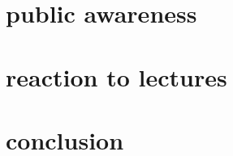 \documentclass[10pt,a4paper,]{article}
\begin{document}
\section{public awareness} 
\section{reaction to lectures}
\section{conclusion} 





\end{document}
